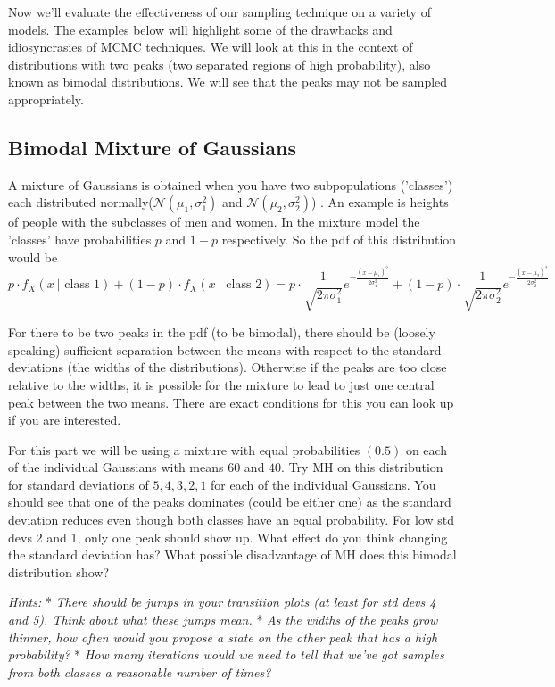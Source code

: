 \documentclass[11pt]{article}
\begin{document}
Now we'll evaluate the effectiveness of our sampling technique on a
variety of models. The examples below will highlight some of the
drawbacks and idiosyncrasies of MCMC techniques. We will look at this in
the context of distributions with two peaks (two separated regions of
high probability), also known as bimodal distributions. We will see that
the peaks may not be sampled appropriately.

\subsection{Bimodal Mixture of
Gaussians}\label{bimodal-mixture-of-gaussians}

A mixture of Gaussians is obtained when you have two subpopulations
('classes') each distributed normally(\(\mathcal{N}(\mu_1,\sigma_1^2)\)
and \(\mathcal{N}(\mu_2,\sigma_2^2)\)) . An example is heights of people
with the subclasses of men and women. In the mixture model the 'classes'
have probabilities \(p\) and \(1-p\) respectively. So the pdf of this
distribution would be
\[p\cdot f_X(x\ |\text{ class 1}) + (1-p)\cdot f_X(x\ |\text{ class 2}) = p\cdot \frac{1}{\sqrt{2\pi \sigma_1^2}} e^{-\frac{(x - \mu_1)^2}{2\sigma_1^2}} + (1-p)\cdot \frac{1}{\sqrt{2\pi \sigma_2^2}} e^{-\frac{(x - \mu_2)^2}{2\sigma_2^2}}
\]

For there to be two peaks in the pdf (to be bimodal), there should be
(loosely speaking) sufficient separation between the means with respect
to the standard deviations (the widths of the distributions). Otherwise
if the peaks are too close relative to the widths, it is possible for
the mixture to lead to just one central peak between the two means.
There are exact conditions for this you can look up if you are
interested.

For this part we will be using a mixture with equal probabilities
\((0.5)\) on each of the individual Gaussians with means \(60\) and
\(40\). Try MH on this distribution for standard deviations of
\(5,4,3,2,1\) for each of the individual Gaussians. You should see that
one of the peaks dominates (could be either one) as the standard
deviation reduces even though both classes have an equal probability.
For low std devs 2 and 1, only one peak should show up. What effect do
you think changing the standard deviation has? What possible
disadvantage of MH does this bimodal distribution show?

\emph{Hints:} * \emph{There should be jumps in your transition plots (at
least for std devs 4 and 5). Think about what these jumps mean.} *
\emph{As the widths of the peaks grow thinner, how often would you
propose a state on the other peak that has a high probability?} *
\emph{How many iterations would we need to tell that we've got samples
from both classes a reasonable number of times?}
\end{document}
